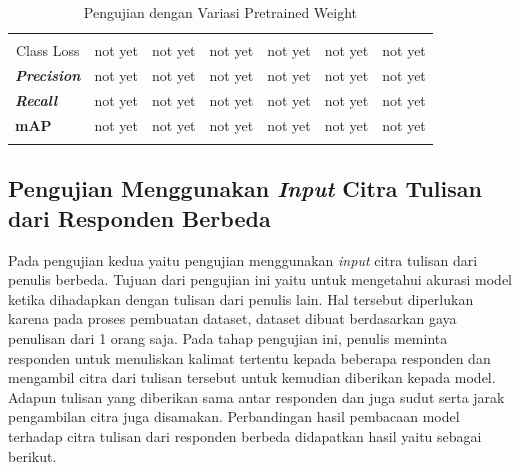 \begin{center}
\begin{longtable}[c]{|c|cc|cc|cc|}
    \textit{\textbf{\begin{tabular}[c]{@{}c@{}}Validation\\ Class Loss\end{tabular}}}  & \multicolumn{1}{c|}{not yet} & not yet & \multicolumn{1}{c|}{not yet} & not yet & \multicolumn{1}{c|}{not yet} & not yet \\ \hline
    \multicolumn{1}{|l|}{\textit{\textbf{Precision}}}                                  & \multicolumn{1}{c|}{not yet} & not yet & \multicolumn{1}{c|}{not yet} & not yet & \multicolumn{1}{c|}{not yet} & not yet \\ \hline
    \multicolumn{1}{|l|}{\textit{\textbf{Recall}}}                                     & \multicolumn{1}{c|}{not yet} & not yet & \multicolumn{1}{c|}{not yet} & not yet & \multicolumn{1}{c|}{not yet} & not yet \\ \hline
    \multicolumn{1}{|l|}{\textbf{mAP}}                                                 & \multicolumn{1}{c|}{not yet} & not yet & \multicolumn{1}{c|}{not yet} & not yet & \multicolumn{1}{c|}{not yet} & not yet \\ \hline
    \caption{Pengujian dengan Variasi Pretrained Weight }
    \label{tb:variasipretrainedweight}\\
  \end{longtable}
\end{center}


\subsection{Pengujian Menggunakan \textit{Input} Citra Tulisan dari Responden Berbeda}
\label{subsec:pengujiancitrabedapenulis}

Pada pengujian kedua yaitu pengujian menggunakan \textit{input} citra tulisan dari penulis berbeda. Tujuan dari pengujian ini yaitu untuk mengetahui akurasi model ketika dihadapkan dengan tulisan dari penulis lain. Hal tersebut diperlukan karena pada proses pembuatan dataset, dataset dibuat berdasarkan gaya penulisan dari 1 orang saja. Pada tahap pengujian ini, penulis meminta responden untuk menuliskan kalimat tertentu kepada beberapa responden dan mengambil citra dari tulisan tersebut untuk kemudian diberikan kepada model. Adapun tulisan yang diberikan sama antar responden dan juga sudut serta jarak pengambilan citra juga disamakan. Perbandingan hasil pembacaan model terhadap citra tulisan dari responden berbeda didapatkan hasil yaitu sebagai berikut.

